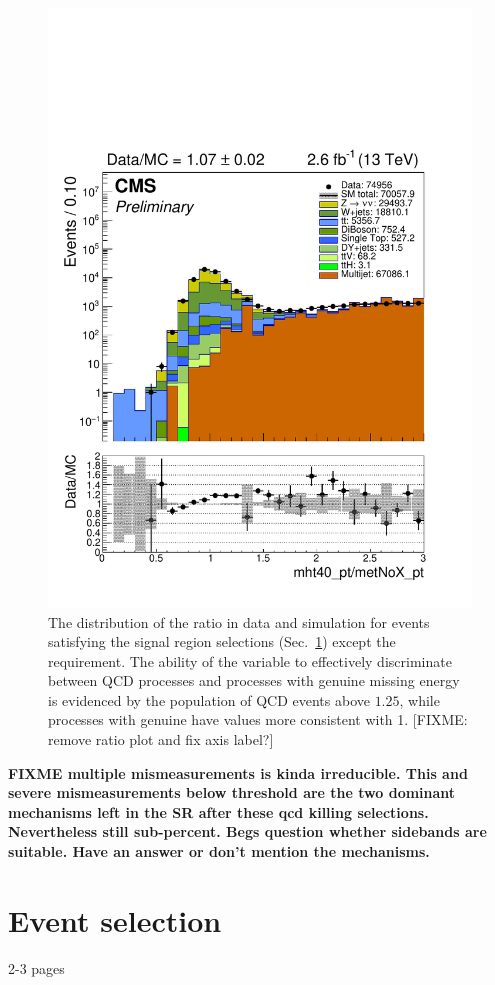 \begin{figure}
\begin{center}
\includegraphics[width=0.7\linewidth]{figs/analysis/mhtmet}
\caption{The distribution of the \mhtmet ratio in data and simulation for 
events satisfying the signal region selections 
(Sec.~\ref{analysis-eventselection}) except the \mhtmet requirement. The 
ability of the variable to effectively discriminate between QCD processes and 
processes with genuine missing energy is evidenced by the population of QCD 
events above $1.25$, while processes with genuine \met have values more 
consistent with 1. [FIXME: remove ratio plot and fix axis label?]}
\label{fig:mhtmet}
\end{center}
\end{figure}




\textbf{FIXME
multiple mismeasurements is kinda irreducible.
This and severe mismeasurements below threshold are the two dominant mechanisms 
left in the SR after these qcd killing selections.
Nevertheless still sub-percent.
Begs question whether sidebands are suitable. Have an answer or don't mention 
the mechanisms.}




\section{Event selection}
\label{analysis-eventselection}
2-3 pages


